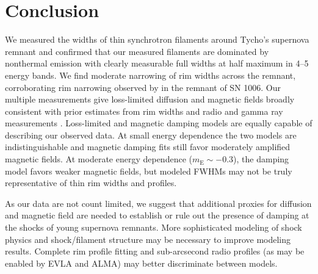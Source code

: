 \documentclass[iop, apj, numberedappendix]{emulateapj}
\newcommand*{\mt}{\mathrm}
\newcommand*{\Chandra}{\textit{Chandra}\ }
\newcommand*{\mE}{m_\mt{E}}
\begin{document}

\section{Conclusion}

We measured the widths of thin synchrotron filaments around Tycho's supernova
remnant and confirmed that our measured filaments are dominated by nonthermal
emission with clearly measurable full widths at half maximum in 4--5 energy
bands.  We find moderate narrowing of rim widths across the remnant,
corroborating rim narrowing observed by \citet{ressler2014} in the remnant of
SN 1006.  Our multiple measurements give loss-limited diffusion and magnetic fields
broadly consistent with prior estimates from rim widths
\citep[e.g.,][]{parizot2006, rettig2012} and radio and gamma ray measurements
\citep{acciari2011, morlino2012}.  Loss-limited and magnetic damping models are
equally capable of describing our observed data.  At small energy dependence
the two models are indistinguishable and magnetic damping fits still favor
moderately amplified magnetic fields.  At moderate energy dependence ($\mE \sim
-0.3$), the damping model favors weaker magnetic fields, but modeled FWHMs may
not be truly representative of thin rim widths and profiles.

As our data are not count limited, we suggest that additional proxies for
diffusion and magnetic field are needed to establish or rule out the presence
of damping at the shocks of young supernova remnants.  More sophisticated
modeling of shock physics \citep[e.g.,][]{zirakashvili2014} and shock/filament
structure \citep[cf.][]{caprioli2013} may be necessary to improve modeling
results.  Complete rim profile fitting and sub-arcsecond radio profiles (as may
be enabled by EVLA and ALMA) may better discriminate between models.

\end{document}
